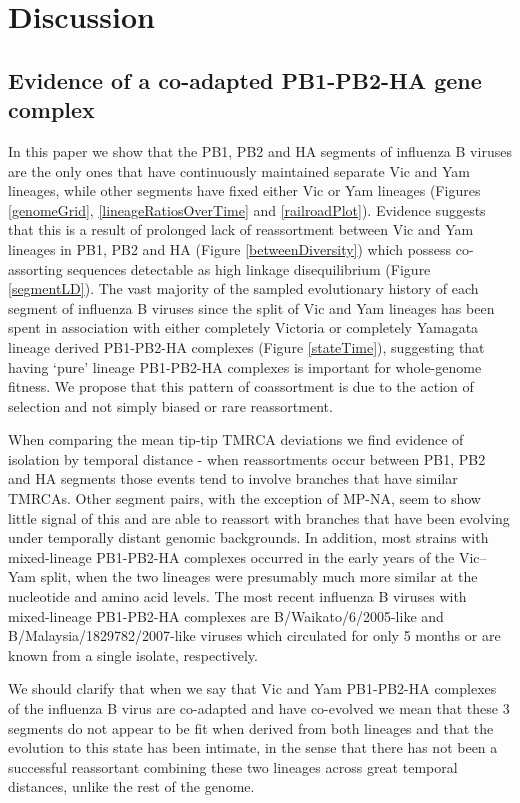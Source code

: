 \documentclass[11pt,oneside,letterpaper]{article}
\begin{document}
\section*{Discussion}

\subsection*{Evidence of a co-adapted PB1-PB2-HA gene complex}
In this paper we show that the PB1, PB2 and HA segments of influenza B viruses are the only ones that have continuously maintained separate Vic and Yam lineages, while other segments have fixed either Vic or Yam lineages (Figures \ref{genomeGrid}, \ref{lineageRatiosOverTime} and \ref{railroadPlot}).
Evidence suggests that this is a result of prolonged lack of reassortment between Vic and Yam lineages in PB1, PB2 and HA (Figure \ref{betweenDiversity}) which possess co-assorting sequences detectable as high linkage disequilibrium (Figure \ref{segmentLD}).
The vast majority of the sampled evolutionary history of each segment of influenza B viruses since the split of Vic and Yam lineages has been spent in association with either completely Victoria or completely Yamagata lineage derived PB1-PB2-HA complexes (Figure \ref{stateTime}), suggesting that having `pure' lineage PB1-PB2-HA complexes is important for whole-genome fitness.
We propose that this pattern of coassortment is due to the action of selection and not simply biased or rare reassortment.

When comparing the mean tip-tip TMRCA deviations we find evidence of isolation by temporal distance - when reassortments occur between PB1, PB2 and HA segments those events tend to involve branches that have similar TMRCAs.
Other segment pairs, with the exception of MP-NA, seem to show little signal of this and are able to reassort with branches that have been evolving under temporally distant genomic backgrounds.
In addition, most strains with mixed-lineage PB1-PB2-HA complexes occurred in the early years of the Vic--Yam split, when the two lineages were presumably much more similar at the nucleotide and amino acid levels.
The most recent influenza B viruses with mixed-lineage PB1-PB2-HA complexes are B/Waikato/6/2005-like and B/Malaysia/1829782/2007-like viruses which circulated for only 5 months or are known from a single isolate, respectively.

We should clarify that when we say that Vic and Yam PB1-PB2-HA complexes of the influenza B virus are co-adapted and have co-evolved we mean that these 3 segments do not appear to be fit when derived from both lineages and that the evolution to this state has been intimate, in the sense that there has not been a successful reassortant combining these two lineages across great temporal distances, unlike the rest of the genome.
\end{document}
